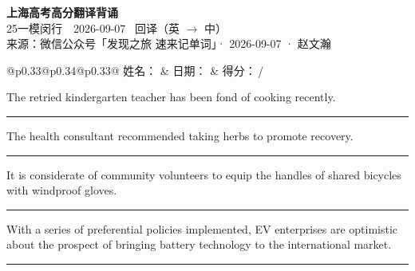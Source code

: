 \documentclass[11pt,a4paper]{article}
\newcommand{\num}[1]{\makebox[1.9em][r]{#1.}\hspace{0.3em}}
\newcommand{\wline}{\noindent\rule{\linewidth}{0.4pt}}
\begin{document}
\pagestyle{plain}
\begin{center}
{\LARGE\bfseries 上海高考高分翻译背诵 }\\[0.25em]
{\large 25一模闵行　2026-09-07 \quad\ 回译（英 $\to$ 中）}\\[0.35em]
{\footnotesize 来源：微信公众号「发现之旅 速来记单词」· 2026-09-07 · 赵文瀚}
\end{center}

\vspace{0.4em}
\noindent\begin{tabular}{@{}p{0.33\textwidth}@{}p{0.34\textwidth}@{}p{0.33\textwidth}@{}}
姓名：\underline{\hspace{2.0cm}} & 日期：\underline{\hspace{2.0cm}} & 得分：\underline{\hspace{1.4cm}}\,/ \\
\end{tabular}

\vspace{0.5em}

\vspace{0.8em}
\num{1}The retried kindergarten teacher has been fond of cooking recently.

\vspace{0.25em}

\wline

\num{2}The health consultant recommended taking herbs to promote recovery.

\vspace{0.25em}

\wline

\num{3}It is considerate of community volunteers to equip the handles of shared bicycles with windproof gloves.

\vspace{0.25em}

\wline

\num{4}With a series of preferential policies implemented, EV enterprises are optimistic about the prospect of bringing battery technology to the international market.

\vspace{0.25em}

\wline
\end{document}

